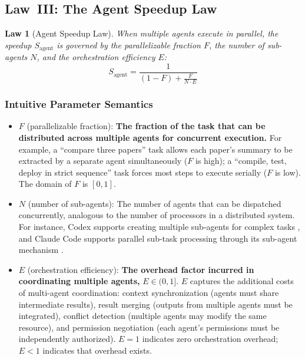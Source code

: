 \documentclass[11pt,a4paper]{article}
\newtheorem{law}{Law}[section]
\begin{document}
\subsection{Law~III: The Agent Speedup Law}
\label{sec:law3}

\begin{law}[Agent Speedup Law]
When multiple agents execute in parallel, the speedup $S_{\mathrm{agent}}$ is governed by the parallelizable fraction $F$, the number of sub-agents $N$, and the orchestration efficiency $E$:
\begin{equation}
\label{eq:agent}
S_{\mathrm{agent}} = \frac{1}{(1-F) + \frac{F}{N \cdot E}}
\end{equation}
\end{law}

\subsubsection{Intuitive Parameter Semantics}

\begin{itemize}[nosep]
\item $F$ (parallelizable fraction): \textbf{The fraction of the task that can be distributed across multiple agents for concurrent execution.} For example, a ``compare three papers'' task allows each paper's summary to be extracted by a separate agent simultaneously ($F$ is high); a ``compile, test, deploy in strict sequence'' task forces most steps to execute serially ($F$ is low). The domain of $F$ is $[0, 1]$.

\item $N$ (number of sub-agents): The number of agents that can be dispatched concurrently, analogous to the number of processors in a distributed system. For instance, Codex supports creating multiple sub-agents for complex tasks \cite{openai_codex_subagents_2026}, and Claude Code supports parallel sub-task processing through its sub-agent mechanism \cite{anthropic_claudecode_subagents_2026}.

\item $E$ (orchestration efficiency): \textbf{The overhead factor incurred in coordinating multiple agents,} $E \in (0, 1]$. $E$ captures the additional costs of multi-agent coordination: context synchronization (agents must share intermediate results), result merging (outputs from multiple agents must be integrated), conflict detection (multiple agents may modify the same resource), and permission negotiation (each agent's permissions must be independently authorized). $E = 1$ indicates zero orchestration overhead; $E < 1$ indicates that overhead exists.
\end{itemize}
\end{document}
